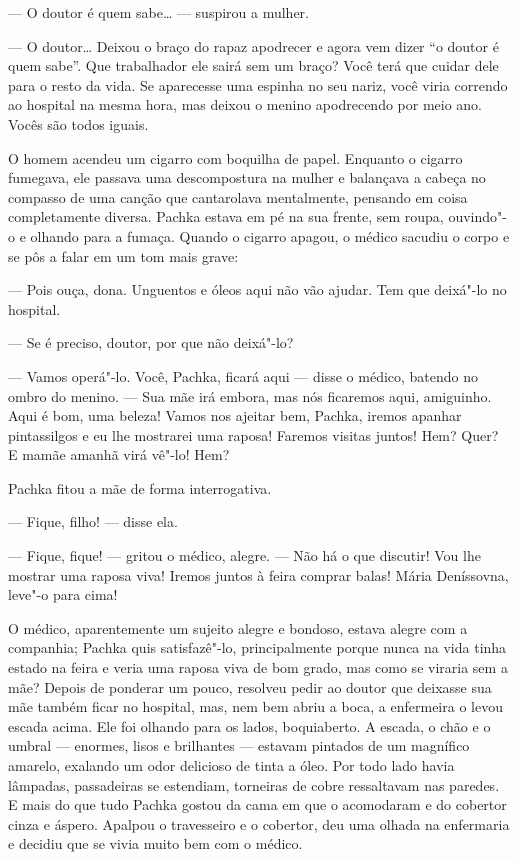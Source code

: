 --- O doutor é quem sabe\ldots{} --- suspirou a mulher.

--- O doutor\ldots{} Deixou o braço do rapaz apodrecer e agora vem dizer ``o
doutor é quem sabe''. Que trabalhador ele sairá sem um braço? Você terá
que cuidar dele para o resto da vida. Se aparecesse uma espinha no seu
nariz, você viria correndo ao hospital na mesma hora, mas deixou o
menino apodrecendo por meio ano. Vocês são todos iguais.

O homem acendeu um cigarro com boquilha de papel. Enquanto o
cigarro fumegava, ele passava uma descompostura na mulher e balançava a
cabeça no compasso de uma canção que cantarolava mentalmente, pensando
em coisa completamente diversa. Pachka estava em pé na sua frente, sem
roupa, ouvindo"-o e olhando para a fumaça. Quando o cigarro apagou, o
médico sacudiu o corpo e se pôs a falar em um tom mais grave:

--- Pois ouça, dona. Unguentos e óleos aqui não vão ajudar. Tem que
deixá"-lo no hospital.

--- Se é preciso, doutor, por que não deixá"-lo?

--- Vamos operá"-lo. Você, Pachka, ficará aqui --- disse o médico,
batendo no ombro do menino. --- Sua mãe irá embora, mas nós ficaremos
aqui, amiguinho. Aqui é bom, uma beleza! Vamos nos ajeitar bem, Pachka,
iremos apanhar pintassilgos e eu lhe mostrarei uma raposa! Faremos
visitas juntos! Hem? Quer? E mamãe amanhã virá vê"-lo! Hem?

Pachka fitou a mãe de forma interrogativa.

--- Fique, filho! --- disse ela.

--- Fique, fique! --- gritou o médico, alegre. --- Não há o que
discutir! Vou lhe mostrar uma raposa viva! Iremos juntos à feira comprar
balas! Mária Deníssovna, leve"-o para cima!

O médico, aparentemente um sujeito alegre e bondoso, estava alegre com a
companhia; Pachka quis satisfazê"-lo, principalmente porque nunca na vida
tinha estado na feira e veria uma raposa viva de bom grado, mas como se
viraria sem a mãe? Depois de ponderar um pouco, resolveu pedir ao doutor
que deixasse sua mãe também ficar no hospital, mas, nem bem abriu a
boca, a enfermeira o levou escada acima. Ele foi olhando para os lados,
boquiaberto. A escada, o chão e o umbral --- enormes, lisos e brilhantes
--- estavam pintados de um magnífico amarelo, exalando um odor delicioso
de tinta a óleo. Por todo lado havia lâmpadas, passadeiras se estendiam,
torneiras de cobre ressaltavam nas paredes. E mais do que tudo Pachka
gostou da cama em que o acomodaram e do cobertor cinza e áspero. Apalpou
o travesseiro e o cobertor, deu uma olhada na enfermaria e decidiu que
se vivia muito bem com o médico.

